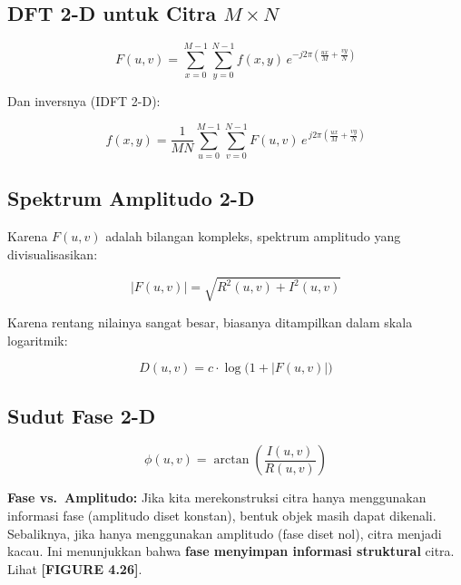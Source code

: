 \documentclass[12pt,a4paper]{article}
\begin{document}
\subsection{DFT 2-D untuk Citra $M \times N$}

\begin{equation}
  F(u,v) = \sum_{x=0}^{M-1} \sum_{y=0}^{N-1}
            f(x,y)\, e^{-j2\pi\!\left(\frac{ux}{M} + \frac{vy}{N}\right)}
  \label{eq:dft_2d}
\end{equation}

Dan inversnya (IDFT 2-D):

\begin{equation}
  f(x,y) = \frac{1}{MN} \sum_{u=0}^{M-1} \sum_{v=0}^{N-1}
            F(u,v)\, e^{\,j2\pi\!\left(\frac{ux}{M} + \frac{vy}{N}\right)}
  \label{eq:idft_2d}
\end{equation}

\subsection{Spektrum Amplitudo 2-D}

Karena $F(u,v)$ adalah bilangan kompleks, spektrum amplitudo yang divisualisasikan:

\begin{equation}
  |F(u,v)| = \sqrt{R^2(u,v) + I^2(u,v)}
  \label{eq:spectrum_2d}
\end{equation}

Karena rentang nilainya sangat besar, biasanya ditampilkan dalam skala logaritmik:

\begin{equation}
  D(u,v) = c \cdot \log\!\bigl(1 + |F(u,v)|\bigr)
  \label{eq:spectrum_log}
\end{equation}

\subsection{Sudut Fase 2-D}

\begin{equation}
  \phi(u,v) = \arctan\!\left(\frac{I(u,v)}{R(u,v)}\right)
  \label{eq:phase_2d}
\end{equation}

\begin{notebox}
\textbf{Fase vs.\ Amplitudo:} Jika kita merekonstruksi citra hanya menggunakan
informasi fase (amplitudo diset konstan), bentuk objek masih dapat dikenali.
Sebaliknya, jika hanya menggunakan amplitudo (fase diset nol), citra menjadi
kacau. Ini menunjukkan bahwa \textbf{fase menyimpan informasi struktural} citra.
Lihat \textbf{[FIGURE 4.26]}.
\end{notebox}
\end{document}
